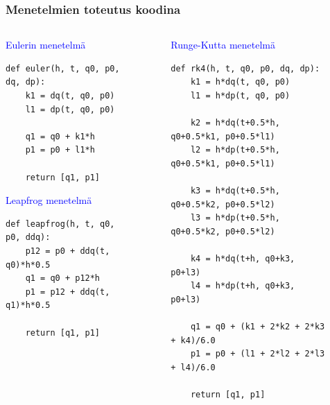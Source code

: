 \documentclass[finnish, 11pt, fleqn]{beamer}
\begin{document}
\begin{frame}[fragile]
	\frametitle{Menetelmien toteutus koodina}
	\begin{columns}[onlytextwidth]
		\begin{column}{.3\textwidth}
			{\tiny
			{\small \textcolor{blue}{Eulerin menetelmä}}
			\begin{lstlisting}
def euler(h, t, q0, p0, dq, dp):
    k1 = dq(t, q0, p0)
    l1 = dp(t, q0, p0)
	
    q1 = q0 + k1*h
    p1 = p0 + l1*h
    				
    return [q1, p1]
			\end{lstlisting}
			\vspace{1em}
			{\small \textcolor{blue}{Leapfrog menetelmä}}
			\begin{lstlisting}
def leapfrog(h, t, q0, p0, ddq):
    p12 = p0 + ddq(t, q0)*h*0.5
    q1 = q0 + p12*h
    p1 = p12 + ddq(t, q1)*h*0.5
    
    return [q1, p1]
			\end{lstlisting}}
		\end{column}
		\hfill
		\begin{column}{.5\textwidth}
			\vspace{-1.5em}			
			\begin{figure}[h!]
			{\tiny
			{\small \hspace{-5.5em} \textcolor{blue}{Runge-Kutta menetelmä}}
			\begin{lstlisting}
def rk4(h, t, q0, p0, dq, dp):
    k1 = h*dq(t, q0, p0)
    l1 = h*dp(t, q0, p0)

    k2 = h*dq(t+0.5*h, q0+0.5*k1, p0+0.5*l1)
    l2 = h*dp(t+0.5*h, q0+0.5*k1, p0+0.5*l1)

    k3 = h*dq(t+0.5*h, q0+0.5*k2, p0+0.5*l2)
    l3 = h*dp(t+0.5*h, q0+0.5*k2, p0+0.5*l2)

    k4 = h*dq(t+h, q0+k3, p0+l3)
    l4 = h*dp(t+h, q0+k3, p0+l3)

    q1 = q0 + (k1 + 2*k2 + 2*k3 + k4)/6.0
    p1 = p0 + (l1 + 2*l2 + 2*l3 + l4)/6.0

    return [q1, p1]
			\end{lstlisting}}
			\end{figure}
		\end{column}
	\end{columns}
\end{frame}
\end{document}
